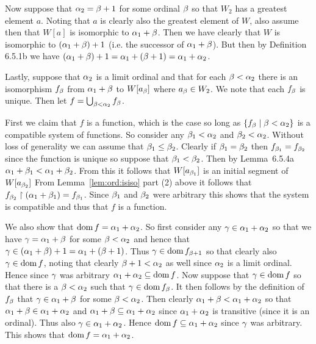 \begin{questions}
{{      Now suppose that $\alpha_2 = \beta+1$ for some ordinal $\beta$ so that $W_2$ has a greatest element $a$.
      Noting that $a$ is clearly also the greatest element of $W$, also assume then that $W[a]$ is isomorphic to $\alpha_1 + \beta$.
      Then we have clearly that $W$ is isomorphic to $(\alpha_1 + \beta) + 1$ (i.e. the successor of $\alpha_1 + \beta$).
      But then by Definition 6.5.1b we have $(\alpha_1 + \beta) + 1 = \alpha_1 + (\beta+ 1) = \alpha_1 + \alpha_2$.

      Lastly, suppose that $\alpha_2$ is a limit ordinal and that for each $\beta < \alpha_2$ there is an isomorphism $f_\beta$ from $\alpha_1 + \beta$ to $W[a_\beta]$ where $a_\beta \in W_2$.
      We note that each $f_\beta$ is unique.
      Then let $f = \bigcup_{\beta < \alpha_2} f_\beta$.

      First we claim that $f$ is a function, which is the case so long as $\left\{ f_\beta \mid \beta < \alpha_2 \right\}$ is a compatible system of functions.
      So consider any $\beta_1 < \alpha_2$ and $\beta_2 < \alpha_2$.
      Without loss of generality we can assume that $\beta_1 \leq \beta_2$.
      Clearly if $\beta_1 = \beta_2$ then $f_{\beta_1} = f_{\beta_2}$ since the function is unique so suppose that $\beta_1 < \beta_2$.
      Then by Lemma~6.5.4a $\alpha_1 + \beta_1 < \alpha_1 + \beta_2$.
      From this it follows that $W[a_{\beta_1}]$ is an initial segment of $W[a_{\beta_2}]$
      From Lemma~\ref{lem:ord:isiso} part (2) above it follows that $f_{\beta_2} \restriction (\alpha_1 + \beta_1) = f_{\beta_1}$.
      Since $\beta_1$ and $\beta_2$ were arbitrary this shows that the system is compatible and thus that $f$ is a function.

      We also show that  $\mathrm{dom}\, f = \alpha_1 + \alpha_2$.
      So first consider any $\gamma \in \alpha_1 + \alpha_2$ so that we have $\gamma = \alpha_1 + \beta$ for some $\beta < \alpha_2$ and hence that $\gamma \in (\alpha_1 + \beta) + 1 = \alpha_1 + (\beta + 1)$.
      Thus $\gamma \in \mathrm{dom}\, f_{\beta+1}$ so that clearly also $\gamma \in \mathrm{dom}\, f$, noting that clearly $\beta+1 < \alpha_2$ as well since $\alpha_2$ is a limit ordinal.
      Hence since $\gamma$ was arbitrary $\alpha_1 + \alpha_2 \subseteq \mathrm{dom}\, f$.
      Now suppose that $\gamma \in \mathrm{dom}\, f$ so that there is a $\beta < \alpha_2$ such that $\gamma \in \mathrm{dom}\, f_\beta$.
      It then follows by the definition of $f_\beta$ that $\gamma \in \alpha_1 + \beta$ for some $\beta < \alpha_2$.
      Then clearly $\alpha_1 + \beta < \alpha_1 + \alpha_2$ so that $\alpha_1 + \beta \in \alpha_1 + \alpha_2$ and $\alpha_1 + \beta \subseteq \alpha_1 + \alpha_2$ since $\alpha_1 + \alpha_2$ is transitive (since it is an ordinal).
      Thus also $\gamma \in \alpha_1 + \alpha_2$.
      Hence $\mathrm{dom}\, f \subseteq \alpha_1 + \alpha_2$ since $\gamma$ was arbitrary.
      This shows that $\mathrm{dom}\, f = \alpha_1 + \alpha_2$.

}}
\end{questions}
